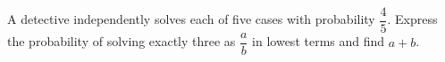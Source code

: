 A detective independently solves each of five cases with probability $\dfrac{4}{5}$. Express the probability of solving exactly three as $\dfrac{a}{b}$ in lowest terms and find $a+b$.
